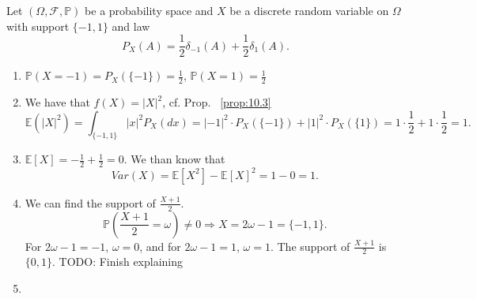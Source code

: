 \begin{exercise}[]
    \label{ex:12.2}
    Let $(\Omega, \mathcal{F}, \mathbb{P})$ be a probability space and $X$ be a discrete random variable on $\Omega$ with 
    support $\{-1,1\} $ and law
    \[
    P_X(A)= \frac{1}{2} \delta_{-1}(A)+\frac{1}{2}\delta_1(A)
    .\] 
    \begin{enumerate}[label=(\alph*)]
        \item
            $\mathbb{P}(X=-1)= P_X(\{-1\} ) = \frac{1}{2}$,
            $\mathbb{P}(X=1) = \frac{1}{2}$
        \item We have that $f(X)=|X|^{2}$, cf. Prop. ~\ref{prop:10.3}
            \[
            \mathbb{E}(|X|^{2}) = \int_{\{-1,1\} }|x|^{2}P_X(dx) = |-1|^{2} \cdot P_X(\{-1\} )+ |1|^{2}\cdot P_X(\{1\} )
            =1\cdot \frac{1}{2} + 1\cdot \frac{1}{2} =1
            .\] 
        \item $\mathbb{E}[X] = -\frac{1}{2} + \frac{1}{2}= 0$. We than know that
            \[
            Var(X) =\mathbb{E}[X^{2}] - \mathbb{E}[X]^{2} = 1-0=1
            .\] 
        \item
            We can find the support of $\frac{X+1}{2}$.
            \[
                \mathbb{P}\left( \frac{X+1}{2}=\omega \right) \neq 0 \Rightarrow X = 2\omega - 1 = \{-1,1\} 
            .\] 
            For $2\omega-1 = -1$, $\omega=0$, and for  $2\omega-1 = 1$,  $\omega=1$. The support of  $\frac{X+1}{2}$ is $\{0,1\} $.
            TODO: Finish explaining
        \item
    \end{enumerate}
\end{exercise}

